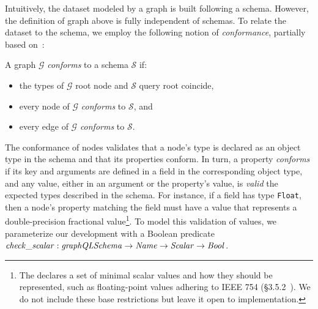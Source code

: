 Intuitively, the dataset modeled by a \gql graph is built following a
schema. However, the definition of \gql graph above is fully
independent of schemas. To relate the dataset to the schema, we employ
the following notion of \textit{conformance}, partially based
on~\cite{gqlph}:
%
\begin{definition}
A \gql graph $\mathcal{G}$ \textit{conforms} to a schema $\mathcal{S}$ if: 
\begin{itemize}
    \item the types of $\mathcal{G}$ root node and $\mathcal{S}$ query
      root coincide,
    \item every node of $\mathcal{G}$ \textit{conforms} to
      $\mathcal{S}$, and
    \item every edge of $\mathcal{G}$ \textit{conforms} to
      $\mathcal{S}$. 
   
\end{itemize}
\end{definition}
%


The conformance of nodes validates that a node's type is declared as an object type
in the schema and that its properties conform. In turn, a property \emph{conforms} if 
its key and arguments are defined in a field in the corresponding
object type, and any value, either in an argument or
the property's value, is \emph{valid} \wrt the expected types described in the schema. 
For instance, if a field has type \texttt{Float}, 
then a node's property matching the field must have a value that represents a double-precision fractional value\footnote{The \spec declares a set of minimal scalar values and how they should be represented, such as floating-point values adhering to IEEE 754 (\cf\S3.5.2~\cite{gqlspec}). We do not include these base restrictions but leave it open to implementation.}.
To model this validation of values, we parameterize our \coq development
with a Boolean predicate $\mathit{check\_scalar} : \mathit{graphQLSchema}
\to \mathit{Name} \to \mathit{Scalar} \to \mathit{Bool}$. 

